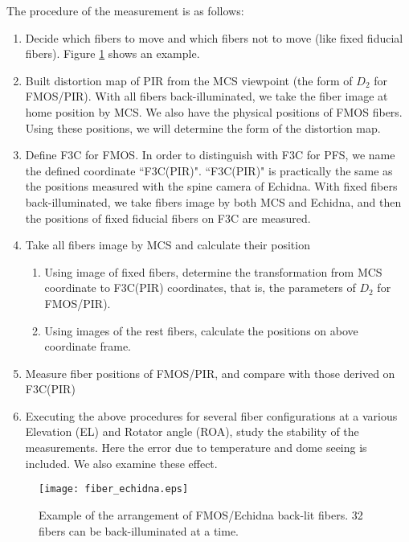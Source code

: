 The procedure of the measurement is as follows:
\begin{enumerate}
\item Decide which fibers to move and which fibers not to move (like fixed fiducial fibers).
Figure \ref{fig:fibEchidna} shows an example.
\item Built distortion map of PIR from the MCS viewpoint (the form of $D_2$ for FMOS/PIR).
With all fibers back-illuminated, we take the fiber image at home position by MCS.
We also have the physical positions of FMOS fibers.
Using these positions, we will determine the form of the distortion map.
\item Define F3C for FMOS. 
In order to distinguish with F3C for PFS, we name the defined coordinate ``F3C(PIR)". 
``F3C(PIR)" is practically the same as the positions measured with the spine camera of Echidna.
With fixed fibers back-illuminated, we take fibers image by both MCS and Echidna, and then the positions of fixed fiducial fibers on F3C are measured.
\item Take all fibers image by MCS and calculate their position
\begin{enumerate}
\item Using image of fixed fibers, determine the transformation from MCS coordinate to F3C(PIR) coordinates, that is, the parameters of $D_2$ for FMOS/PIR). 
\item Using images of the rest fibers, calculate the positions on above coordinate frame.
\end{enumerate}
\item Measure fiber positions of FMOS/PIR, and compare with those derived on F3C(PIR)
\item Executing the above procedures for several fiber configurations at a various Elevation (EL) and Rotator angle (ROA), study the stability of the measurements.
Here the error due to temperature and dome seeing is included.
We also examine these effect.
\end{enumerate}

\begin{figure}[!ht]
\begin{center}
\texttt{[image: fiber\_echidna.eps]}
\end{center}
\caption{
Example of the arrangement of FMOS/Echidna back-lit fibers.
32 fibers can be back-illuminated at a time. }
\label{fig:fibEchidna}
\end{figure}

